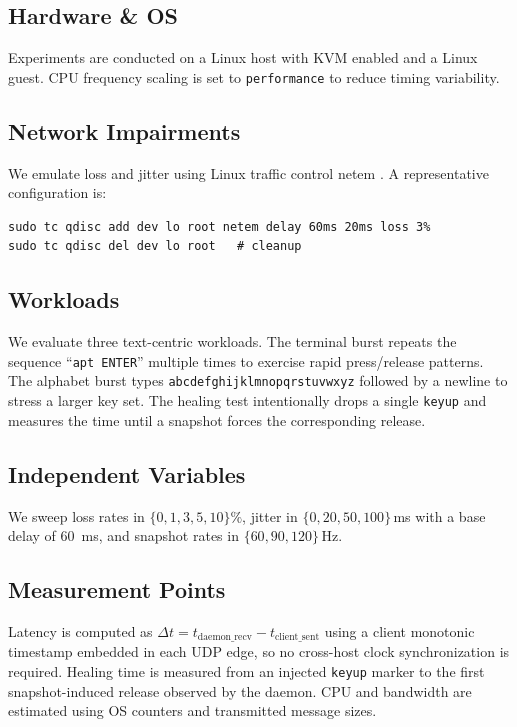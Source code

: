 \documentclass[11pt]{article}
\begin{document}
\subsection{Hardware \& OS}
Experiments are conducted on a Linux host with KVM enabled and a Linux guest. CPU frequency scaling is set to \texttt{performance} to reduce timing variability.
\subsection{Network Impairments}
We emulate loss and jitter using Linux traffic control netem \citep{netem}. A representative configuration is:
\begin{verbatim}
sudo tc qdisc add dev lo root netem delay 60ms 20ms loss 3%
sudo tc qdisc del dev lo root   # cleanup
\end{verbatim}
\subsection{Workloads}
We evaluate three text-centric workloads. The terminal burst repeats the sequence ``\texttt{apt ENTER}'' multiple times to exercise rapid press/release patterns. The alphabet burst types \texttt{abcdefghijklmnopqrstuvwxyz} followed by a newline to stress a larger key set. The healing test intentionally drops a single \texttt{keyup} and measures the time until a snapshot forces the corresponding release.
\subsection{Independent Variables}
We sweep loss rates in \(\{0,1,3,5,10\}\%\), jitter in \(\{0,20,50,100\}\)\,ms with a base delay of \SI{60}{ms}, and snapshot rates in \(\{60,90,120\}\)\,Hz.
\subsection{Measurement Points}
Latency is computed as \(\Delta t = t_{\mathrm{daemon\_recv}} - t_{\mathrm{client\_sent}}\) using a client monotonic timestamp embedded in each UDP edge, so no cross-host clock synchronization is required. Healing time is measured from an injected \texttt{keyup} marker to the first snapshot-induced release observed by the daemon. CPU and bandwidth are estimated using OS counters and transmitted message sizes.
\end{document}
